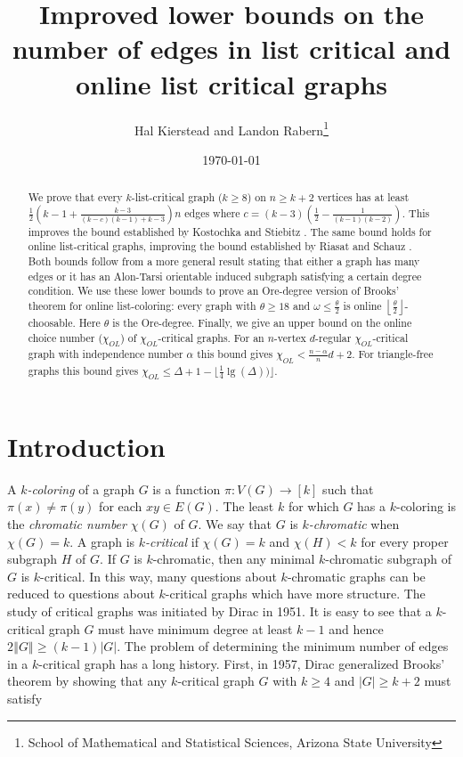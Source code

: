 \documentclass[12pt]{article}
\title{Improved lower bounds on the number of edges in list critical and online list critical graphs}
\author{Hal Kierstead and Landon Rabern\thanks{School of Mathematical and Statistical Sciences, Arizona State University}}
\date{\today}
\theoremstyle{plain}
\theoremstyle{definition}
\theoremstyle{remark}
\newcommand{\card}[1]{\left|#1\right|}
\newcommand{\size}[1]{\left\Vert#1\right\Vert}
\newcommand{\func}[3]{#1\colon #2 \rightarrow #3}
\newcommand{\irange}[1]{\left[#1\right]}
\begin{document}
\maketitle

\begin{abstract}
We prove that every $k$-list-critical graph ($k \geq 8$) on $n \geq k+2$ vertices has at least $\frac12 \left(k-1 + \frac{k-3}{(k-c)(k-1) + k-3}\right)n$ edges where $c = (k-3)\left(\frac12 - \frac{1}{(k-1)(k-2)}\right)$.  This improves the bound established by Kostochka and Stiebitz \cite{kostochkastiebitzedgesincriticalgraph}.  The same bound holds for online list-critical graphs, improving the bound established by Riasat and Schauz \cite{riasat2012critically}.  Both bounds follow from a more general result stating that either a graph has many edges or it has an Alon-Tarsi orientable induced subgraph satisfying a certain degree condition.  We use these lower bounds to prove an Ore-degree version of Brooks' theorem for online list-coloring: every graph with $\theta \geq 18$ and $\omega \le \frac{\theta}{2}$ is online $\left\lfloor\frac{\theta}{2}\right\rfloor$-choosable.  Here $\theta$ is the Ore-degree.
Finally, we give an upper bound on the online choice number ($\chi_{OL}$) of $\chi_{OL}$-critical graphs. For an $n$-vertex $d$-regular $\chi_{OL}$-critical graph with independence number $\alpha$ this bound gives $\chi_{OL} < \frac{n - \alpha}{n}d + 2$.  For triangle-free graphs this bound gives $\chi_{OL} \le \Delta + 1 - \lfloor\frac14 \lg(\Delta))\rfloor$.
\end{abstract}

\section{Introduction}
A \emph{$k$-coloring} of a graph $G$ is a function $\func{\pi}{V(G)}{\irange{k}}$ such that $\pi(x) \neq \pi(y)$ for each $xy \in E(G)$.  The least $k$ for which $G$ has a $k$-coloring is the \emph{chromatic number} $\chi(G)$ of $G$. We say that $G$ is \emph{$k$-chromatic} when $\chi(G) = k$.  A graph is \emph{$k$-critical} if $\chi(G) = k$ and $\chi(H) < k$ for every proper subgraph $H$ of $G$.  If $G$ is $k$-chromatic, then any minimal $k$-chromatic subgraph of $G$ is $k$-critical.  In this way, many questions about $k$-chromatic graphs can be reduced to questions about $k$-critical graphs which have more structure.  The study of critical graphs was initiated by Dirac \cite{dirac1951note} in 1951.  It is easy to see that a $k$-critical graph $G$ must have minimum degree at least $k-1$ and hence $2\size{G} \geq (k-1)\card{G}$.  The problem of determining the minimum number of edges in a $k$-critical graph has a long history. First, in 1957, Dirac \cite{dirac1957theorem} generalized Brooks' theorem \cite{brooks1941colouring} by showing that any $k$-critical graph $G$ with $k \geq 4$ and $\card{G} \geq k+2$ must satisfy 
\end{document}
